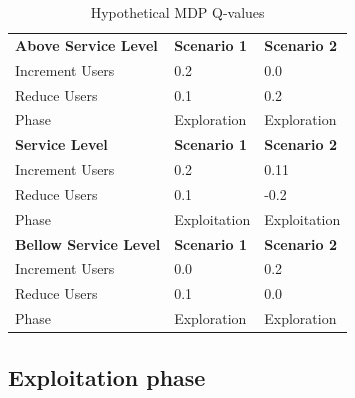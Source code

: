 \documentclass[espaco=umemeio,chapter=TITLE,twoside,openright]{abnt}
\begin{document}
\begin{table}[h]
\centering
\caption{Hypothetical MDP Q-values }
\label{pab:mdp}
\begin{tabular}{lll}
\rowcolor[HTML]{C0C0C0} 
\textbf{Above Service Level}  & \textbf{Scenario 1} & \textbf{Scenario 2} \\
Increment Users               & 0.2                 & 0.0                 \\
Reduce Users                  & 0.1                 & 0.2                 \\
Phase                         & Exploration         & Exploration         \\
\rowcolor[HTML]{C0C0C0} 
\textbf{Service Level}        & \textbf{Scenario 1} & \textbf{Scenario 2} \\
Increment Users               & 0.2                 & 0.11                \\
Reduce Users                  & 0.1                 & -0.2                \\
\rowcolor[HTML]{F8FF00} 
Phase                         & Exploitation         & Exploitation         \\
\rowcolor[HTML]{C0C0C0} 
\textbf{Bellow Service Level} & \textbf{Scenario 1} & \textbf{Scenario 2} \\
Increment Users               & 0.0                 & 0.2                 \\
Reduce Users                  & 0.1                 & 0.0                 \\
Phase                         & Exploration         & Exploration        
\end{tabular}
\end{table}

\subsection{Exploitation phase}
\end{document}
